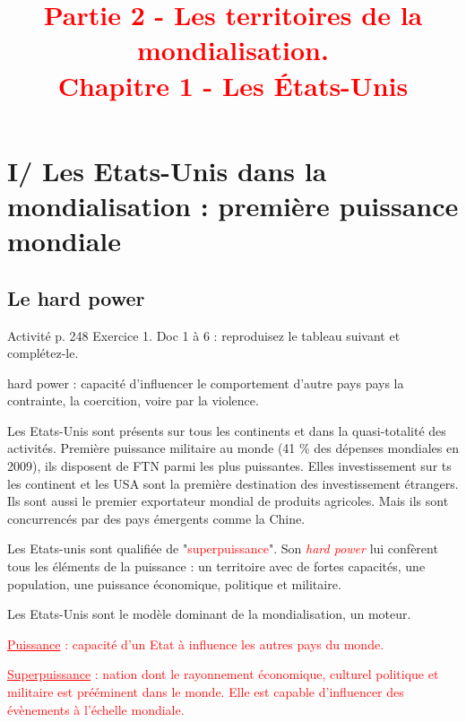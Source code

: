 \documentclass{beamer}
\title{{\textcolor{red}{Partie 2 - Les territoires de la mondialisation.
      \\Chapitre 1 - Les États-Unis }}}
\begin{document}
 
\begin{frame}
\titlepage %
\end{frame}

\begin{frame}
\tableofcontents
\end{frame}

\section{I/ Les Etats-Unis dans la mondialisation : première puissance mondiale}
\subsection{Le hard power}

\begin{frame}
Activité p. 248
Exercice 1. Doc 1 à 6 : reproduisez le tableau suivant et complétez-le.
\end{frame}

\begin{frame}

hard power : capacité d'influencer le comportement d'autre pays pays la contrainte, la coercition, voire par la violence.



Les Etats-Unis sont présents sur tous les continents et dans la quasi-totalité des activités. Première puissance militaire au monde (41 \% des dépenses mondiales en 2009), ils disposent de FTN parmi les plus puissantes. Elles investissement sur ts les continent et les USA sont la première destination des investissement étrangers. Ils sont aussi le premier exportateur mondial de produits agricoles. Mais ils sont concurrencés par des pays émergents comme la Chine.

Les Etats-unis sont qualifiée de "\textcolor{red}{superpuissance}". Son \textcolor{red}{\textit{hard power}} lui confèrent tous les éléments de la puissance : un territoire avec de fortes capacités, une population, une puissance économique, politique et militaire.

Les Etats-Unis sont le modèle dominant de la mondialisation, un moteur.

\textcolor{red}{\underline{Puissance} : capacité d'un Etat à influence les autres pays du monde.}

\textcolor{red}{\underline{Superpuissance} : nation dont le rayonnement économique, culturel politique et militaire est prééminent dans le monde. Elle est capable d'influencer des évènements à l'échelle mondiale.}


\end{frame}
\end{document}
